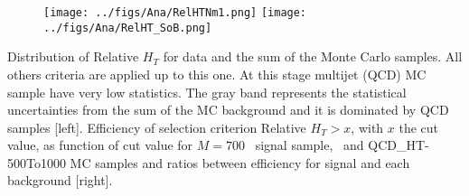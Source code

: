 \begin{frame}{}
\vspace{-.2cm}

\begin{figure}[!Hhtbp]
  \begin{center}
    \texttt{[image: ../figs/Ana/RelHTNm1.png]}
    \texttt{[image: ../figs/Ana/RelHT\_SoB.png]}
  \end{center}
\end{figure}

\vspace{-.5cm}
    \begin{block}{}
      \tiny \centering Distribution of Relative $H_{T}$ for data and the sum of the Monte Carlo samples. All others criteria are applied up to this one. At this stage multijet (QCD) MC sample have very low statistics. The gray band represents the statistical uncertainties from the sum of the MC background and it is dominated by QCD samples [left]. Efficiency of selection criterion Relative $H_{T}>x$, with $x$ the cut value, as function of cut value for $M=700$ \GeVcc~signal sample, \ttbar~and QCD\_HT-500To1000 MC samples and ratios between efficiency for signal and each background [right].
    \end{block}

\end{frame}

